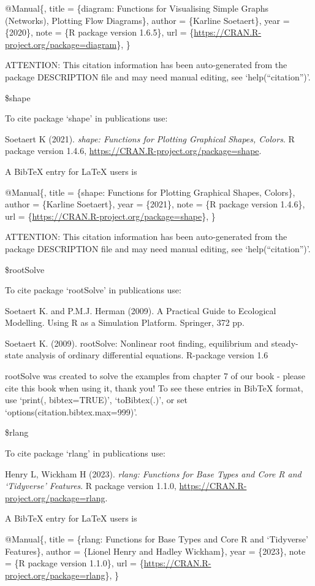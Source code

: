 \documentclass[
]{article}
\begin{document}
@Manual\{, title = \{diagram: Functions for Visualising Simple Graphs
(Networks), Plotting Flow Diagrams\}, author = \{Karline Soetaert\},
year = \{2020\}, note = \{R package version 1.6.5\}, url =
\{\url{https://CRAN.R-project.org/package=diagram}\}, \}

ATTENTION: This citation information has been auto-generated from the
package DESCRIPTION file and may need manual editing, see
`help(``citation'')'.

\$shape

To cite package `shape' in publications use:

Soetaert K (2021). \emph{shape: Functions for Plotting Graphical Shapes,
Colors}. R package version 1.4.6,
\url{https://CRAN.R-project.org/package=shape}.

A BibTeX entry for LaTeX users is

@Manual\{, title = \{shape: Functions for Plotting Graphical Shapes,
Colors\}, author = \{Karline Soetaert\}, year = \{2021\}, note = \{R
package version 1.4.6\}, url =
\{\url{https://CRAN.R-project.org/package=shape}\}, \}

ATTENTION: This citation information has been auto-generated from the
package DESCRIPTION file and may need manual editing, see
`help(``citation'')'.

\$rootSolve

To cite package `rootSolve' in publications use:

Soetaert K. and P.M.J. Herman (2009). A Practical Guide to Ecological
Modelling. Using R as a Simulation Platform. Springer, 372 pp.

Soetaert K. (2009). rootSolve: Nonlinear root finding, equilibrium and
steady-state analysis of ordinary differential equations. R-package
version 1.6

rootSolve was created to solve the examples from chapter 7 of our book -
please cite this book when using it, thank you! To see these entries in
BibTeX format, use `print(, bibtex=TRUE)', `toBibtex(.)', or set
`options(citation.bibtex.max=999)'.

\$rlang

To cite package `rlang' in publications use:

Henry L, Wickham H (2023). \emph{rlang: Functions for Base Types and
Core R and `Tidyverse' Features}. R package version 1.1.0,
\url{https://CRAN.R-project.org/package=rlang}.

A BibTeX entry for LaTeX users is

@Manual\{, title = \{rlang: Functions for Base Types and Core R and
`Tidyverse' Features\}, author = \{Lionel Henry and Hadley Wickham\},
year = \{2023\}, note = \{R package version 1.1.0\}, url =
\{\url{https://CRAN.R-project.org/package=rlang}\}, \}
\end{document}
